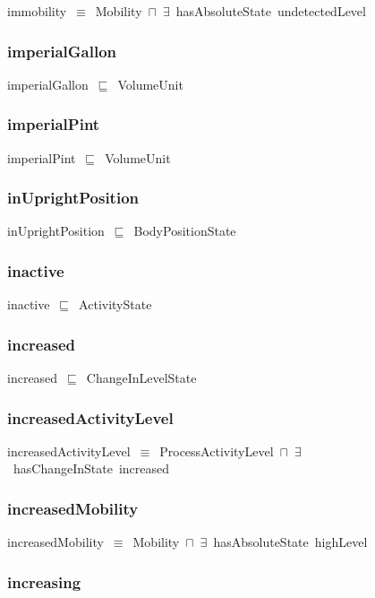 \documentclass{article}
\begin{document}
immobility~\ensuremath{\equiv}~Mobility~\ensuremath{\sqcap}~\ensuremath{\exists}~hasAbsoluteState~undetectedLevel

\subsubsection*{imperialGallon}

imperialGallon~\ensuremath{\sqsubseteq}~VolumeUnit~

\subsubsection*{imperialPint}

imperialPint~\ensuremath{\sqsubseteq}~VolumeUnit~

\subsubsection*{inUprightPosition}

inUprightPosition~\ensuremath{\sqsubseteq}~BodyPositionState~

\subsubsection*{inactive}

inactive~\ensuremath{\sqsubseteq}~ActivityState~

\subsubsection*{increased}

increased~\ensuremath{\sqsubseteq}~ChangeInLevelState~

\subsubsection*{increasedActivityLevel}

increasedActivityLevel~\ensuremath{\equiv}~ProcessActivityLevel~\ensuremath{\sqcap}~\ensuremath{\exists}~hasChangeInState~increased

\subsubsection*{increasedMobility}

increasedMobility~\ensuremath{\equiv}~Mobility~\ensuremath{\sqcap}~\ensuremath{\exists}~hasAbsoluteState~highLevel

\subsubsection*{increasing}
\end{document}
